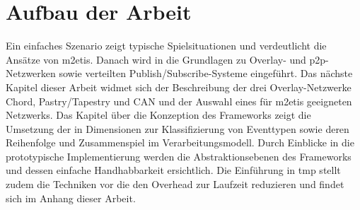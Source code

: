 \section*{Aufbau der Arbeit}
Ein einfaches Szenario zeigt typische Spielsituationen und verdeutlicht die Ansätze von \ac{m2etis}. Danach wird in die Grundlagen zu Overlay- und p2p-Netzwerken sowie verteilten Publish/Subscribe-Systeme eingeführt. Das nächste Kapitel dieser Arbeit widmet sich der Beschreibung der drei Overlay-Netzwerke Chord, Pastry/Tapestry und CAN und der Auswahl eines für \ac{m2etis} geeigneten Netzwerks. Das Kapitel über die Konzeption des Frameworks zeigt die Umsetzung der in  Dimensionen zur Klassifizierung von Eventtypen sowie deren Reihenfolge und Zusammenspiel im Verarbeitungsmodell. Durch Einblicke in die prototypische Implementierung werden die Abstraktionsebenen des Frameworks und dessen einfache Handhabbarkeit ersichtlich. Die Einführung in \ac{tmp} stellt zudem die Techniken vor die den Overhead zur Laufzeit reduzieren und findet sich im Anhang dieser Arbeit.
